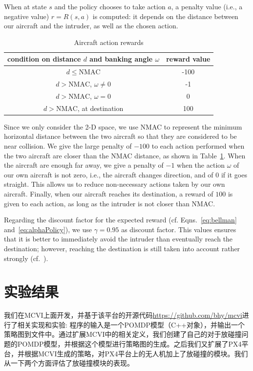 \documentclass{article}
\newcommand{\reward}{R}
\newcommand{\discount}{\gamma}
\begin{document}
When at state $s$ and the policy chooses to take action $a$, a penalty value (i.e., a negative value) $r = \reward(s, a)$ is computed:
it depends on the distance between our aircraft and the intruder, as well as the chosen action.

\begin{table}[t]
	\caption{Aircraft action rewards}
	\label{tab:NMACpenalties}
	\centering
	\begin{tabular}{c|c}
		condition on distance $d$ and banking angle $\omega$ & reward value \\
		\hline
		$d \leq \text{NMAC}$ & -100 \\
		$d > \text{NMAC}$, $\omega \neq 0$ & -1 \\
		$d > \text{NMAC}$, $\omega = 0$ & 0 \\
		$d > \text{NMAC}$, at destination & 100 
	\end{tabular}
\end{table}

Since we only consider the 2-D space, we use NMAC to represent the minimum horizontal distance between the two aircraft so that they are considered to be near collision. 
We give the large penalty of $-100$ to each action performed when the two aircraft are closer than the NMAC distance, as shown in Table~\ref{tab:NMACpenalties}.
When the aircraft are enough far away, we give a penalty of $-1$ when the action $\omega$ of our own aircraft is not zero, i.e., the aircraft changes direction, and of $0$ if it goes straight.
This allows us to reduce non-necessary actions taken by our own aircraft. 
Finally, when our aircraft reaches its destination, a reward of $100$ is given to each action, as long as the intruder is not closer than NMAC.

Regarding the discount factor for the expected reward (cf. Eqns.~\eqref{eq:bellman} and~\eqref{eq:alphaPolicy}), we use $\discount = 0.95$ as discount factor.
This values ensures that it is better to immediately avoid the intruder than eventually reach the destination; 
however, reaching the destination is still taken into account rather strongly (cf.~\cite{RLIntro}).


\section{实验结果}
\label{sec:experiments}
我们在MCVI\cite{DBLP:conf/rss/Bai-RSS-11}上面开发，并基于该平台的开源代码\url{https://github.com/bhy/mcvi}进行了相关实现和实验: 程序的输入是一个POMDP模型（C++对象），并输出一个策略图到文件中。通过扩展MCVI中的相关定义，我们创建了自己的对于放碰撞问题的POMDP模型，并根据这个模型进行策略图的生成。之后我们又扩展了PX4平台，并根据MCVI生成的策略，对PX4平台上的无人机加上了放碰撞的模块。我们从一下两个方面评估了放碰撞模块的表现。
\end{document}
